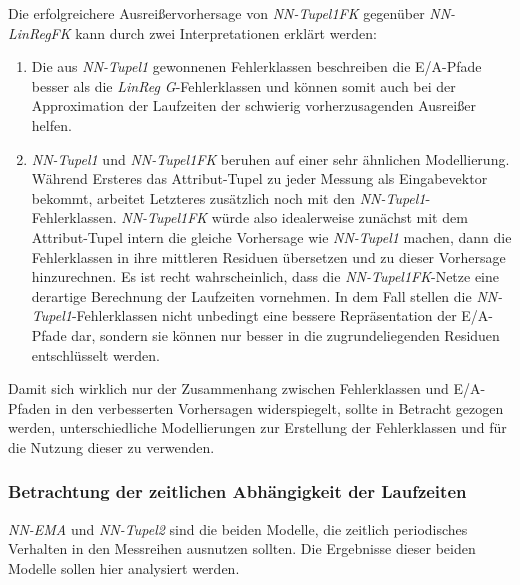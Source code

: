 \documentclass[
	twoside,
	12pt,
	a4paper,
	BCOR10mm,
	DIV14,
	listof=totoc,
	bibliography=totoc,
	headsepline
]{scrreprt}
\begin{document}
Die erfolgreichere Ausreißervorhersage von \textit{NN-Tupel1FK} gegenüber \textit{NN-LinRegFK} kann durch zwei Interpretationen erklärt werden:
\begin{enumerate}
	\item Die aus \textit{NN-Tupel1} gewonnenen Fehlerklassen beschreiben die E/A-Pfade besser als die \textit{LinReg G}-Fehlerklassen und können somit auch bei der Approximation der Laufzeiten der schwierig vorherzusagenden Ausreißer helfen.
	\item \textit{NN-Tupel1} und \textit{NN-Tupel1FK} beruhen auf einer sehr ähnlichen Modellierung.
	Während Ersteres das Attribut-Tupel zu jeder Messung als Eingabevektor bekommt, arbeitet Letzteres zusätzlich noch mit den \textit{NN-Tupel1}-Fehlerklassen.
	\textit{NN-Tupel1FK} würde also idealerweise zunächst mit dem Attribut-Tupel intern die gleiche Vorhersage wie \textit{NN-Tupel1} machen, dann die Fehlerklassen in ihre mittleren Residuen übersetzen und zu dieser Vorhersage hinzurechnen.
	Es ist recht wahrscheinlich, dass die \textit{NN-Tupel1FK}-Netze eine derartige Berechnung der Laufzeiten vornehmen.
	In dem Fall stellen die \textit{NN-Tupel1}-Fehlerklassen nicht unbedingt eine bessere Repräsentation der E/A-Pfade dar, sondern sie können nur besser in die zugrundeliegenden Residuen entschlüsselt werden.
\end{enumerate}
Damit sich wirklich nur der Zusammenhang zwischen Fehlerklassen und E/A-Pfaden in den verbesserten Vorhersagen widerspiegelt, sollte in Betracht gezogen werden, unterschiedliche Modellierungen zur Erstellung der Fehlerklassen und für die Nutzung dieser zu verwenden.

\subsubsection{Betrachtung der zeitlichen Abhängigkeit der Laufzeiten}
\textit{NN-EMA} und \textit{NN-Tupel2} sind die beiden Modelle, die zeitlich periodisches Verhalten in den Messreihen ausnutzen sollten.
Die Ergebnisse dieser beiden Modelle sollen hier analysiert werden.\medskip
\end{document}
